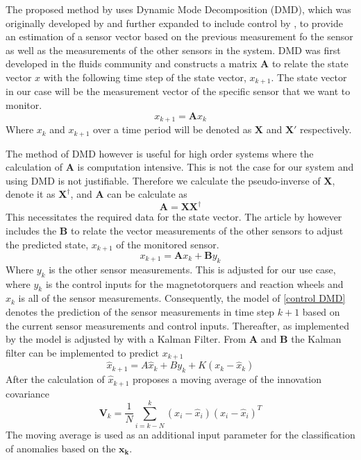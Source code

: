 \documentclass[letterpaper, 10 pt, conference]{ieeeconf}  %
\begin{document}
The proposed method by \textcite{DeSilva2020} uses Dynamic Mode Decomposition (DMD), which was originally developed by \textcite{schmid2011applications} and further expanded to include control by \textcite{proctor2016dynamic}, to provide an estimation of a sensor vector based on the previous measurement fo the sensor as well as the measurements of the other sensors in the system. DMD was first developed in the fluids community and constructs a matrix $\mathbf{A}$ to relate the state vector $x$ with the following time step of the state vector, $x_{k+1}$. The state vector in our case will be the measurement vector of the specific sensor that we want to monitor.
\begin{equation}
	x_{k+1} = \mathbf{A}x_k
\end{equation}
Where $x_k$ and $x_{k+1}$ over a time period will be denoted as $\mathbf{X}$ and $\mathbf{X'}$ respectively.

The method of DMD however is useful for high order systems where the calculation of $\mathbf{A}$ is computation intensive. This is not the case for our system and using DMD is not justifiable. Therefore we calculate the pseudo-inverse of $\mathbf{X}$, denote it as $\mathbf{X^{\dagger}}$, and $\mathbf{A}$ can be calculate as
\begin{equation}
	\mathbf{A} = \mathbf{X}\mathbf{X^{\dagger}}
\end{equation}
This necessitates the required data for the state vector. The article by \textcite{DeSilva2020} however includes the $\mathbf{B}$ to relate the vector measurements of the other sensors to adjust the predicted state, $x_{k+1}$ of the monitored sensor. 
\begin{equation}
	x_{k+1} = \boldsymbol{A}x_k + \boldsymbol{B}y_k
	\label{control DMD}
\end{equation}
Where $y_k$ is the other sensor measurements. This is adjusted for our use case, where $y_k$ is the control inputs for the magnetotorquers and reaction wheels and $x_k$ is all of the sensor measurements. Consequently, the model of \ref{control DMD} denotes the prediction of the sensor measurements in time step $k+1$ based on the current sensor measurements and control inputs.
Thereafter, as implemented by \textcite{DeSilva2020} the model is adjusted by with a Kalman Filter. From $\boldsymbol{A}$ and $\boldsymbol{B}$ the Kalman filter can be implemented to predict $x_{k+1}$
\begin{equation}
	\hat{x}_{k+1} = A\hat{x}_k + By_k + K(x_k - \hat{x}_k)
\end{equation}
After  the calculation of $\hat{x}_{k+1}$ \textcite{DeSilva2020} proposes a moving average of the innovation covariance
\begin{equation}
	\boldsymbol{V}_k = \frac{1}{N} \sum_{i=k-N}^k (x_i - \hat{x}_i)(x_i - \hat{x}_i)^T
\end{equation}
The moving average is used as an additional input parameter for the classification of anomalies based on the $\boldsymbol{x_k}$.
\end{document}

